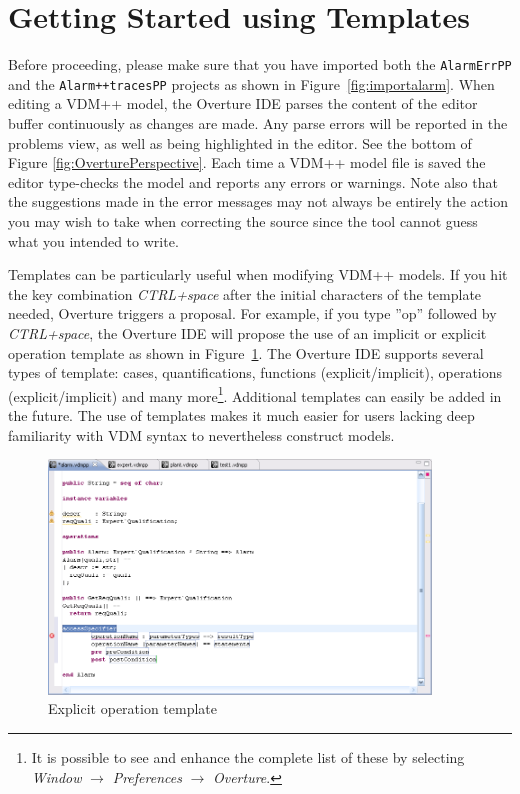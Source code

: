 \section{Getting Started using Templates}\label{sec:templates}

Before proceeding, please make sure that you have imported both the
\texttt{AlarmErrPP} and the \texttt{Alarm++tracesPP} projects as shown in
Figure~\ref{fig:importalarm}. When editing a VDM++ model, the Overture IDE parses the content of the
editor buffer continuously as changes are made. Any parse errors will
be reported in the problems view, as well as being highlighted in the
editor. See the bottom of Figure
\ref{fig:OverturePerspective}. Each time a VDM++ model file is
saved the editor type-checks the model and reports any errors or
warnings. Note also that the suggestions made in the error messages
may not always be entirely the action you may wish to take when
correcting the source since the tool cannot guess what you intended
to write.

Templates can be particularly useful when modifying VDM++ models. If you hit
the key combination \textit{CTRL+space} after the initial characters
of the template needed, Overture triggers a proposal. For example, if
you type ''op'' followed by \textit{CTRL+space}, the Overture IDE
will propose the use of an implicit or explicit operation template as
shown in Figure~\ref{fig:operationTemplate}. The Overture IDE
supports several types of template: cases, quantifications, functions
(explicit/implicit), operations (explicit/implicit) and many
more\footnote{It is possible to see and enhance the complete list of
  these by selecting \emph{Window} $\rightarrow$ \emph{Preferences}
  $\rightarrow$ \emph{Overture}.}. 
Additional templates can easily be added in the future. The use
of templates makes it much easier for users lacking deep familiarity
with VDM syntax to nevertheless construct models.

\begin{figure}
	\begin{center}
	\includegraphics[width=4in]{figures/OperationTemplate}
	\caption{Explicit operation template}
	\label{fig:operationTemplate}
	\end{center}
\end{figure}

